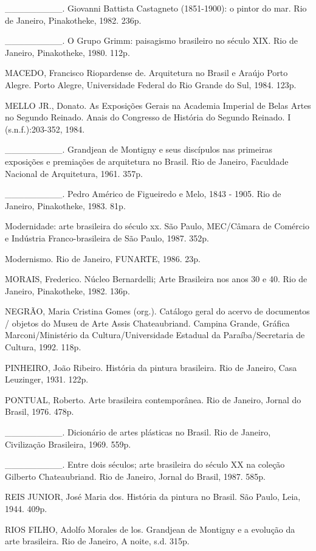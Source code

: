 \_\_\_\_\_\_\_\_\_. Giovanni Battista Castagneto (1851-1900): o pintor do mar. Rio de Janeiro, Pinakotheke, 1982. 236p.

\_\_\_\_\_\_\_\_\_. O Grupo Grimm: paisagismo brasileiro no século XIX. Rio de Janeiro, Pinakotheke, 1980. 112p.

MACEDO, Francisco Riopardense de. Arquitetura no Brasil e Araújo Porto Alegre. Porto Alegre, Universidade Federal do Rio Grande do Sul, 1984. 123p.

MELLO JR., Donato. As Exposições Gerais na Academia Imperial de Belas Artes no Segundo Reinado. Anais do Congresso de História do Segundo Reinado. I (s.n.f.):203-352, 1984.

\_\_\_\_\_\_\_\_\_. Grandjean de Montigny e seus discípulos nas primeiras exposições e premiações de arquitetura no Brasil. Rio de Janeiro, Faculdade Nacional de Arquitetura, 1961. 357p.

\_\_\_\_\_\_\_\_\_. Pedro Américo de Figueiredo e Melo, 1843 - 1905. Rio de Janeiro, Pinakotheke, 1983. 81p.

Modernidade: arte brasileira do século xx. São Paulo, MEC/Câmara de Comércio e Indústria Franco-brasileira de São Paulo, 1987. 352p.

Modernismo. Rio de Janeiro, FUNARTE, 1986. 23p.

MORAIS, Frederico. Núcleo Bernardelli; Arte Brasileira nos anos 30 e 40. Rio de Janeiro, Pinakotheke, 1982. 136p.

NEGRÃO, Maria Cristina Gomes (org.). Catálogo geral do acervo de documentos / objetos do Museu de Arte Assis Chateaubriand. Campina Grande, Gráfica Marconi/Ministério da Cultura/Universidade Estadual da Paraíba/Secretaria de Cultura, 1992. 118p.

PINHEIRO, João Ribeiro. História da pintura brasileira. Rio de Janeiro, Casa Leuzinger, 1931. 122p.

PONTUAL, Roberto. Arte brasileira contemporânea. Rio de Janeiro, Jornal do Brasil, 1976. 478p.

\_\_\_\_\_\_\_\_\_. Dicionário de artes plásticas no Brasil. Rio de Janeiro, Civilização Brasileira, 1969. 559p.

\_\_\_\_\_\_\_\_\_. Entre dois séculos; arte brasileira do século XX na coleção Gilberto Chateaubriand. Rio de Janeiro, Jornal do Brasil, 1987. 585p.

REIS JUNIOR, José Maria dos. História da pintura no Brasil. São Paulo, Leia, 1944. 409p.

RIOS FILHO, Adolfo Morales de los. Grandjean de Montigny e a evolução da arte brasileira. Rio de Janeiro, A noite, s.d. 315p.

